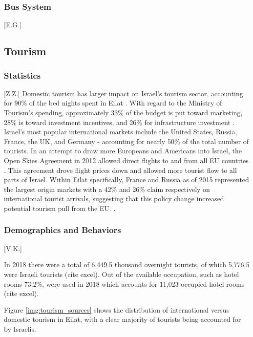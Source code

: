 \documentclass[12pt]{article}                       %
\begin{document}
\subsubsection{Bus System}[E.G.]

\subsection{Tourism}
\subsubsection{Statistics}[Z.Z.]
Domestic tourism has larger impact on Israel's tourism sector, accounting for 90\% of the bed nights spent in Eilat \cite{Benner2017UpgradingEilat}. With regard to the Ministry of Tourism's spending, approximately 33\% of the budget is put toward marketing, 28\% is toward investment incentives, and 26\% for infrastructure investment \cite{Benner2017UpgradingEilat}. Israel's most popular international markets include the United States, Russia, France, the UK, and Germany - accounting for nearly 50\% of the total number of tourists. In an attempt to draw more Europeans and Americans into Israel, the Open Skies Agreement in 2012 allowed direct flights to and from all EU countries \cite{Benner2017UpgradingEilat}. This agreement drove flight prices down and allowed more tourist flow to all parts of Israel. Within Eilat specifically, France and Russia as of 2015 represented the largest origin markets with a 42\% and 26\% claim respectively on international tourist arrivals, suggesting that this policy change increased potential tourism pull from the EU. \cite{Benevolo2016SmartBenefits}.

\subsubsection{Demographics and Behaviors}[V.K.]

In 2018 there were a total of 6,449.5 thousand overnight tourists, of which 5,776.5 were Israeli tourists (cite excel).  Out of the available occupation, such as hotel rooms 73.2\%, were used in 2018 which accounts for 11,023 occupied hotel rooms (cite excel).

Figure \ref{img:tourism_sources} shows the distribution of international versus domestic tourism in Eilat, with a clear majority of tourists being accounted for by Israelis.
\end{document}
